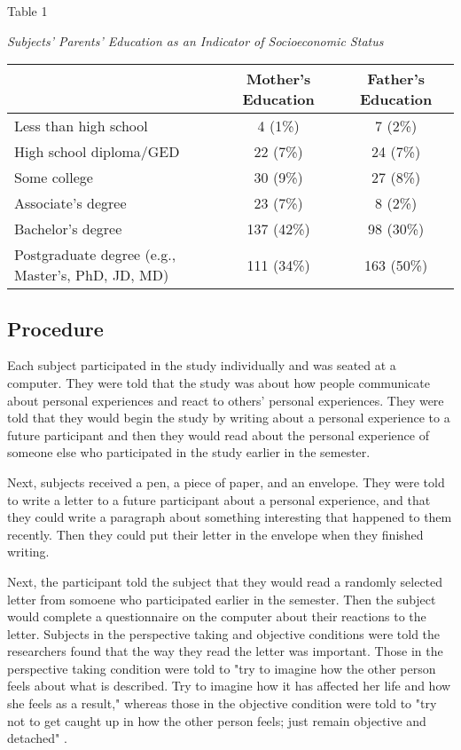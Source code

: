 \documentclass[man,a4paper,noextraspace,apacite]{apa6}\usepackage[]{graphicx}\usepackage[]{color}
\begin{document}
\begin{table}
  Table 1
  
  \textit{Subjects' Parents' Education as an Indicator of Socioeconomic Status}

  \begin{tabular}{l c c}
     \hline
     & Mother's Education & Father's Education \\
     \hline
     Less than high school & 
        4 (1\%) & 
        7 (2\%) \\
     High school diploma/GED & 
        22 (7\%) & 
        24 (7\%) \\
     Some college & 
        30 (9\%) & 
        27 (8\%) \\
     Associate's degree & 
        23 (7\%) & 
        8 (2\%) \\
     Bachelor's degree & 
        137 (42\%) & 
        98 (30\%) \\
     Postgraduate degree (e.g., Master's, PhD, JD, MD) & 
        111 (34\%) & 
        163 (50\%) \\
     \hline
  \end{tabular}

\end{table}

\subsection{Procedure}
Each subject participated in the study individually and was seated at a computer. They were told that the study was about how people communicate about personal experiences and react to others' personal experiences. They were told that they would begin the study by writing about a personal experience to a future participant and then they would read about the personal experience of someone else who participated in the study earlier in the semester.

Next, subjects received a pen, a piece of paper, and an envelope. They were told to write a letter to a future participant about a personal experience, and that they could write a paragraph about something interesting that happened to them recently. Then they could put their letter in the envelope when they finished writing. 

Next, the participant told the subject that they would read a randomly selected letter from somoene who participated earlier in the semester. Then the subject would complete a questionnaire on the computer about their reactions to the letter. Subjects in the perspective taking and objective conditions were told the researchers found that the way they read the letter was important. Those in the perspective taking condition were told to "try to imagine how the other person feels about what is described. Try to imagine how it has affected her life and how she feels as a result," whereas those in the objective condition were told to "try not to get caught up in how the other person feels; just remain objective and detached" \cite{Batson2002, Batson2007}.
\end{document}
